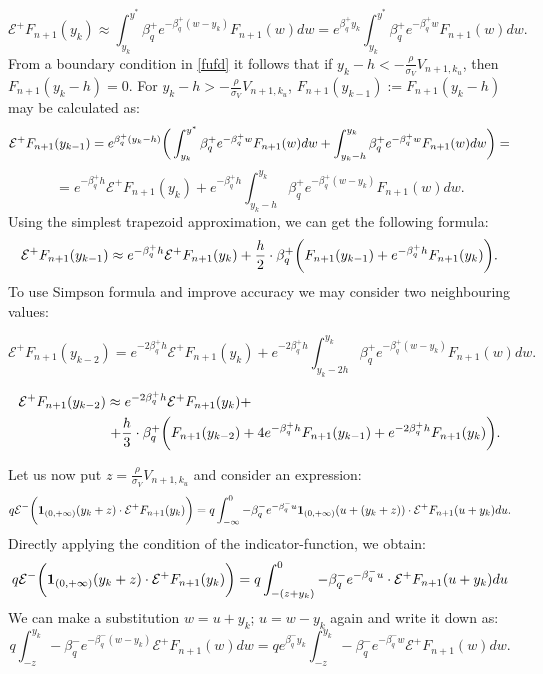 \documentclass[a4paper]{jpconf}
\begin{document}
{$$ \mathcal{E}^+F_{n+1}(y_k) \approx \int_{y_k}^{y^{\ast}} \beta^+_{q} e^{-\beta^+_{q}(w-y_k)}F_{n+1}(w) dw 
= e^{\beta^+_{q}y_k} \int_{y_k}^{y^{\ast}} \beta^+_{q} e^{-\beta^+_{q}w} F_{n+1}(w) dw.$$
From a boundary condition in \eqref{fufd} it follows that if $y_k - h < -\frac{\rho}{\sigma_V}V_{n+1,k_u}$, then $F_{n+1}(y_{k} - h) = 0$. For $y_k - h > -\frac{\rho}{\sigma_V}V_{n+1,k_u}$, $F_{n+1}(y_{k-1}) := F_{n+1}(y_{k}-h)$ may be calculated as:
$$\mathcal{E}^+ F_{n+1}(y_{k-1}) = 
e^{\beta^+_{q}(y_k - h)} \biggr{(}\int_{y_k}^{y^{\ast}}  \beta^+_{q} e^{-\beta^+_{q} w} F_{n+1}(w) dw + \int_{y_k - h}^{y_k} \beta^+_{q} e^{-\beta^+_{q} w} F_{n+1}(w) dw \biggr{)} = $$
$$ = e^{-\beta^+_{q} h} \mathcal{E}^+ F_{n+1}(y_k) + e^{-\beta^+_{q}h}\int_{y_k - h}^{y_k} \beta^+_{q} e^{-\beta^+_{q} (w - y_k)} F_{n+1}(w) dw. $$
Using the simplest trapezoid approximation, we can get the following formula:
$$\mathcal{E}^+ F_{n+1}(y_{k-1}) \approx e^{-\beta^+_{q} h}\mathcal{E}^+ F_{n+1}(y_k) + \frac{h}{2} \cdot \beta^+_{q} \biggr{(}F_{n+1}(y_{k-1}) + e^{-\beta^+_{q} h} F_{n+1}(y_k)\biggr{)}. $$
To use Simpson formula and improve accuracy we may consider two neighbouring values:

$$\mathcal{E}^+ F_{n+1}(y_{k-2}) =  e^{-2\beta^+_{q} h} \mathcal{E}^+ F_{n+1}(y_k) + e^{-2\beta^+_{q}h}\int_{y_k - 2h}^{y_k} \beta^+_{q} e^{-\beta^+_{q} (w - y_k)} F_{n+1}(w) dw. $$

\begin{align}
\mathcal{E}^+ F_{n+1}(y_{k-2}) \approx e^{-2\beta^+_{q} h}\mathcal{E}^+ F_{n+1}(y_k) &+ \\ + \frac{h}{3} \cdot \beta^+_{q} \biggr{(}
F_{n+1}(y_{k-2}) &+ 
4 e^{-\beta^+_{q} h}  F_{n+1}(y_{k-1}) + e^{-2\beta^+_{q} h} F_{n+1}(y_k)\biggr{)}. 
\end{align}

Let us now put $z = \frac{\rho}{\sigma_V} V_{n+1,k_u}$ and consider an expression:
$$q \mathcal{E^-} \biggr{(} \mathbf{1}_{(0, +\infty)}(y_k + z)\cdot \mathcal{E}^+ F_{n+1}(y_k) \biggr{)} = q \int_{-\infty}^{0} -\beta^-_{q} e^{-\beta^-_{q} u} \mathbf{1}_{(0, +\infty)}(u+(y_k+z)) \cdot \mathcal{E}^+ F_{n+1}(u+y_k) du.$$
Directly applying the condition of the indicator-function, we obtain:
$$q \mathcal{E^-} \biggr{(} \mathbf{1}_{(0, +\infty)}(y_k + z)\cdot \mathcal{E}^+ F_{n+1}(y_k) \biggr{)} = 
q \int_{-(z+y_k)}^{0} -\beta^-_{q} e^{-\beta^-_{q} u} \cdot \mathcal{E}^+ F_{n+1}(u+y_k) du$$
We can make a substitution $w = u + y_k$; $u = w - y_k $ again and write it down as:
$$ q \int_{-z}^{y_k} -\beta^-_{q} e^{-\beta^-_{q} (w-y_k)} \mathcal{E}^+ F_{n+1}(w) dw = 
q e^{\beta^-_{q} y_k }\int_{-z}^{y_k} - \beta^-_{q} e^{-\beta^-_{q} w} \mathcal{E}^+ F_{n+1}(w) dw.$$

}
\end{document}
